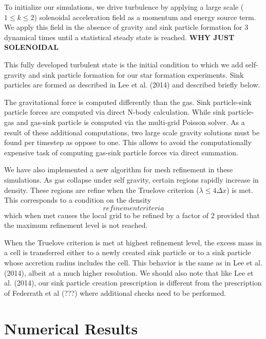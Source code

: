 \documentclass{emulateapj}
\begin{document}
To initialize our simulations, we drive turbulence by applying a large scale ($1 \le k \le 2$) solenoidal 
acceleration field as a momentum and energy source term.  We apply this field in the absence of gravity and sink particle formation for 3 dynamical times until a statistical steady state is reached.
{\bf WHY JUST SOLENOIDAL}

This fully developed turbulent state is the initial condition to which we add self-gravity and sink particle formation for
our star formation experiments. Sink particles are formed as described in Lee et al. (2014) and described briefly below.  

The gravitational force is computed differently than the gas. Sink particle-sink particle forces are computed via direct N-body calculation. While sink particle-gas and gas-sink particle is computed via the multi-grid Poisson solver.  As a result of these additional computations, two large scale gravity solutions must be found per timestep as oppose to one.  This allows to avoid the computationally expensive task of computing gas-sink particle forces via direct summation. 

We have also implemented a new algorithm for mesh refinement in these simulations.  As gas collapse under self gravity, certain regions rapidly increase in density.  These regions are refine when the Truelove criterion ($\lambda \le 4 \Delta x$) is met. This corresponds to a condition on the density 
\begin{equation}
refinement criteria
\end{equation}
which when met causes the local grid to be refined by a factor of 2 provided that the maximum refinement level is not reached.

When the Truelove criterion is met at highest refinement level, the excess mass in a cell is transferred either to a newly created sink particle or to a sink particle whose accretion radius includes the cell.  This behavior is the same as in Lee et al. (2014), albeit at a much higher resolution.  We should also note that like Lee et al. (2014), our sink particle creation prescription is different from the prescription of Federrath et al (???) where additional checks need to be performed.


\section{Numerical Results}
\end{document}
